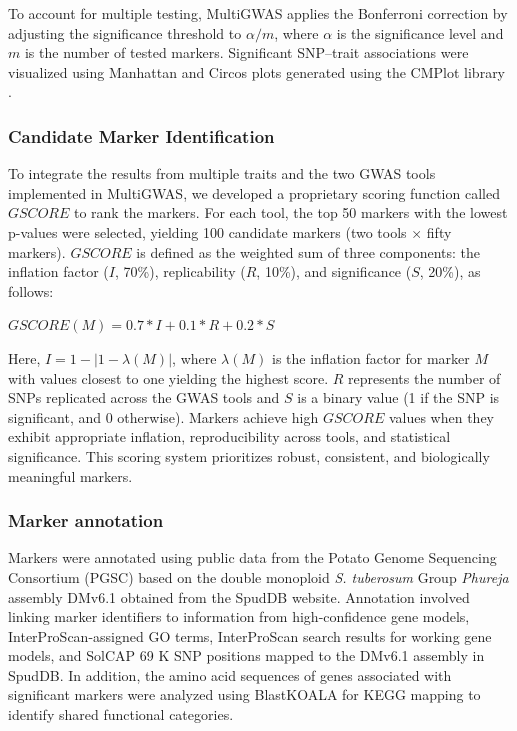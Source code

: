 \documentclass[pdflatex,sn-mathphys-ay]{sn-jnl}%
\begin{document}
To account for multiple testing, MultiGWAS applies the Bonferroni correction by adjusting the significance threshold to $\alpha/m$, where $\alpha$ is the significance level and $m$ is the number of tested markers. Significant SNP–trait associations were visualized using Manhattan and Circos plots generated using the CMPlot library \citep{CMPlot}.


\subsubsection*{Candidate Marker Identification \label{score}}

To integrate the results from multiple traits and the two GWAS tools implemented in MultiGWAS, we developed a proprietary scoring function called $GSCORE$ to rank the markers. For each tool, the top 50 markers with the lowest p-values were selected, yielding 100 candidate markers (two tools × fifty markers). $GSCORE$ is defined as the weighted sum of three components: the inflation factor ($I$, 70\%), replicability ($R$, 10\%), and significance ($S$, 20\%), as follows:


\begin{center}
$GSCORE(M)=0.7*I+0.1*R+0.2*S$
\par\end{center}

Here, $I=1-|1-\lambda(M)|$, where $\lambda(M)$ is the inflation factor for marker $M$ with values closest to one yielding the highest score. $R$ represents the number of SNPs replicated across the GWAS tools and $S$ is a binary value (1 if the SNP is significant, and 0 otherwise). Markers achieve high $GSCORE$ values when they exhibit appropriate inflation, reproducibility across tools, and statistical significance. This scoring system prioritizes robust, consistent, and biologically meaningful markers.
 


\subsubsection*{Marker annotation\label{subsec:OwnScoreFunction}}

Markers were annotated using public data from the Potato Genome Sequencing Consortium (PGSC) based on the double monoploid \textit{S. tuberosum} Group \textit{Phureja} assembly DMv6.1 \citep{Pham2020} obtained from the SpudDB website. Annotation involved linking marker identifiers to information from high-confidence gene models, InterProScan-assigned GO terms, InterProScan search results for working gene models, and SolCAP 69 K SNP positions mapped to the DMv6.1 assembly in SpudDB. In addition, the amino acid sequences of genes associated with significant markers were analyzed using BlastKOALA \citep{kanehisa2016blastkoala} for KEGG mapping to identify shared functional categories.
\end{document}
